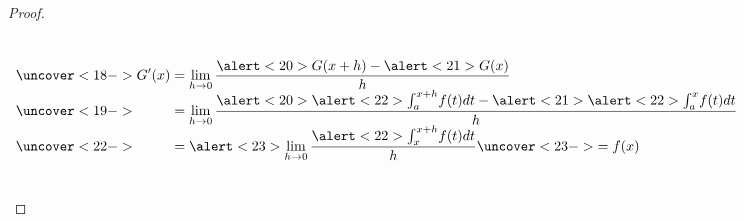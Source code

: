 \begin{frame}
\begin{proof}[Proof]
\begin{columns}
{\[
\begin{array}{l}
\uncover<18->{\displaystyle G'(x)=\lim\limits_{h\to 0}\frac{ \alert<20>{ G(x+h)} -\alert<21>{G(x)}}{h} }\\
\uncover<19->{\displaystyle \phantom{ G'(x) }= \lim\limits_{h\to 0}  \frac{ \alert<20>{ \alert<22>{\int_{a}^{x+h}} f(t)dt} - \alert<21>{ \alert<22>{\int_{a}^{x}} f(t)dt}}{h} }\\
\uncover<22->{\displaystyle \phantom{ G'(x) }= \alert<23>{\lim\limits_{h\to 0}\frac{\alert<22>{\int_{x}^{x+h}}f(t)dt }{h} \uncover<23->{=f(x)}}}
\end{array}
\]

}
\end{columns}
\end{proof}
\end{frame}
